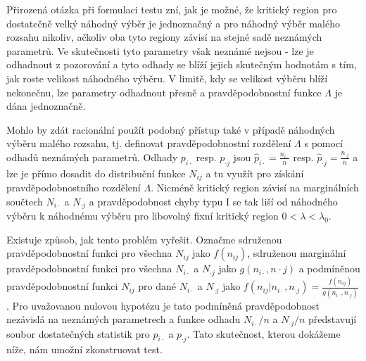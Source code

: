 Přirozená otázka při formulaci testu zní, jak je možné, že kritický region pro dostatečně velký náhodný výběr je jednoznačný a pro náhodný výběr malého rozsahu nikoliv, ačkoliv oba tyto regiony závisí na stejné sadě neznámých parametrů. Ve skutečnosti tyto parametry však neznámé nejsou - lze je odhadnout z pozorování a tyto odhady se blíží jejich skutečným hodnotám s tím, jak roste velikost náhodného výběru. V limitě, kdy se velikost výběru blíží nekonečnu, lze parametry odhadnout přesně a pravděpodobnostní funkce $\Lambda$ je dána jednoznačně.

Mohlo by zdát racionální použít podobný přístup také v případě náhodných výběru malého rozsahu, tj. definovat pravděpodobnostní rozdělení $\Lambda$ s pomocí odhadů neznámých parametrů. Odhady $p_{i \cdot}$ resp. $p_{\cdot j}$ jsou $\hat{p}_{i \cdot} = \frac{n_{i \cdot}}{n}$ resp. $\hat{p}_{\cdot j} = \frac{n_{\cdot j}}{n}$ a lze je přímo dosadit do distribuční funkce $N_{ij}$ a tu využít pro získání pravděpodobnostního rozdělení $\Lambda$. Nicméně kritický region závisí na marginálních součtech $N_{i \cdot}$ a $N_{\cdot j}$ a pravděpodobnost chyby typu I se tak liší od náhodného výběru k náhodnému výběru pro libovolný fixní kritický region $0 < \lambda < \lambda_0$.

Existuje způsob, jak tento problém vyřešit. Označme sdruženou pravděpodobnostní funkci pro všechna $N_{ij}$ jako $f(n_{ij})$, sdruženou marginální pravděpodobnostní funkci pro všechna $N_{i \cdot}$ a $N_{\cdot j}$ jako $g(n_{i \cdot}, n_{}\cdot j)$ a podmíněnou pravděpodobnostní funkci $N_{ij}$ pro dané $N_{i \cdot}$ a $N_{\cdot j}$ jako $f(n_{ij}|n_{i \cdot}, n_{\cdot j}) = \frac{f(n_{ij})}{g(n_{i \cdot}, n_{\cdot j})}$. Pro uvažovanou nulovou hypotézu je tato podmíněná pravděpodobnost nezávislá na neznámých parametrech a funkce odhadu $N_{i \cdot} / n$ a $N_{\cdot j}/n$ představují soubor dostatečných statistik pro $p_{i \cdot}$ a $p_{\cdot j}$. Tato skutečnost, kterou dokážeme níže, nám umožní zkonstruovat test.

